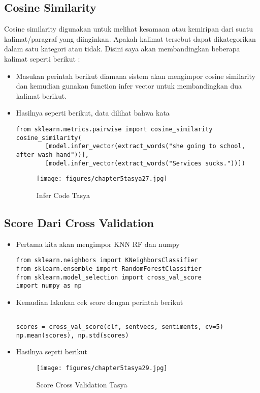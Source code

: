 \subsection{Cosine Similarity}
Cosine similarity digunakan untuk melihat kesamaan atau kemiripan dari suatu kalimat/paragraf yang diinginkan. Apakah kalimat tersebut dapat dikategorikan dalam satu kategori atau tidak.
Disini saya akan membandingkan beberapa kalimat seperti berikut :
\begin{itemize}
\item Masukan perintah berikut diamana sistem akan mengimpor cosine similarity dan kemudian gunakan function infer vector untuk membandingkan dua kalimat berikut.
\item Hasilnya seperti berikut, data dilihat bahwa kata 
\begin{verbatim}
from sklearn.metrics.pairwise import cosine_similarity
cosine_similarity(
        [model.infer_vector(extract_words("she going to school, after wash hand"))],
        [model.infer_vector(extract_words("Services sucks."))])
\end{verbatim}
\begin{figure}[ht]
\centering
\texttt{[image: figures/chapter5tasya27.jpg]}
\caption{Infer Code Tasya}
\label{Praktek}
\end{figure}
\end{itemize}

\subsection{Score Dari Cross Validation}
\begin{itemize}
\item Pertama kita akan mengimpor KNN RF dan numpy
\begin{verbatim}
from sklearn.neighbors import KNeighborsClassifier
from sklearn.ensemble import RandomForestClassifier
from sklearn.model_selection import cross_val_score
import numpy as np
\end{verbatim}
\item Kemudian lakukan cek score dengan perintah berikut 
\begin{verbatim}

scores = cross_val_score(clf, sentvecs, sentiments, cv=5)
np.mean(scores), np.std(scores)
\end{verbatim}

\item Hasilnya seprti berikut
\begin{figure}[ht]
\centering
\texttt{[image: figures/chapter5tasya29.jpg]}
\caption{Score Cross Validation Tasya}
\label{Praktek}
\end{figure}
\end{itemize}

